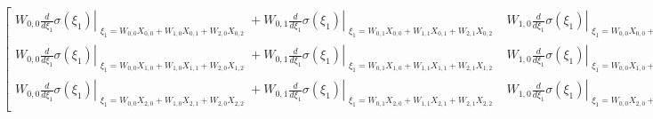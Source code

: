 \documentclass[11pt]{article}
\begin{document}
    $\displaystyle \left[\begin{matrix}W_{0, 0} \left. \frac{d}{d \xi_{1}} \sigma{\left(\xi_{1} \right)} \right|_{\substack{ \xi_{1}=W_{0, 0} X_{0, 0} + W_{1, 0} X_{0, 1} + W_{2, 0} X_{0, 2} }} + W_{0, 1} \left. \frac{d}{d \xi_{1}} \sigma{\left(\xi_{1} \right)} \right|_{\substack{ \xi_{1}=W_{0, 1} X_{0, 0} + W_{1, 1} X_{0, 1} + W_{2, 1} X_{0, 2} }} & W_{1, 0} \left. \frac{d}{d \xi_{1}} \sigma{\left(\xi_{1} \right)} \right|_{\substack{ \xi_{1}=W_{0, 0} X_{0, 0} + W_{1, 0} X_{0, 1} + W_{2, 0} X_{0, 2} }} + W_{1, 1} \left. \frac{d}{d \xi_{1}} \sigma{\left(\xi_{1} \right)} \right|_{\substack{ \xi_{1}=W_{0, 1} X_{0, 0} + W_{1, 1} X_{0, 1} + W_{2, 1} X_{0, 2} }} & W_{2, 0} \left. \frac{d}{d \xi_{1}} \sigma{\left(\xi_{1} \right)} \right|_{\substack{ \xi_{1}=W_{0, 0} X_{0, 0} + W_{1, 0} X_{0, 1} + W_{2, 0} X_{0, 2} }} + W_{2, 1} \left. \frac{d}{d \xi_{1}} \sigma{\left(\xi_{1} \right)} \right|_{\substack{ \xi_{1}=W_{0, 1} X_{0, 0} + W_{1, 1} X_{0, 1} + W_{2, 1} X_{0, 2} }}\\W_{0, 0} \left. \frac{d}{d \xi_{1}} \sigma{\left(\xi_{1} \right)} \right|_{\substack{ \xi_{1}=W_{0, 0} X_{1, 0} + W_{1, 0} X_{1, 1} + W_{2, 0} X_{1, 2} }} + W_{0, 1} \left. \frac{d}{d \xi_{1}} \sigma{\left(\xi_{1} \right)} \right|_{\substack{ \xi_{1}=W_{0, 1} X_{1, 0} + W_{1, 1} X_{1, 1} + W_{2, 1} X_{1, 2} }} & W_{1, 0} \left. \frac{d}{d \xi_{1}} \sigma{\left(\xi_{1} \right)} \right|_{\substack{ \xi_{1}=W_{0, 0} X_{1, 0} + W_{1, 0} X_{1, 1} + W_{2, 0} X_{1, 2} }} + W_{1, 1} \left. \frac{d}{d \xi_{1}} \sigma{\left(\xi_{1} \right)} \right|_{\substack{ \xi_{1}=W_{0, 1} X_{1, 0} + W_{1, 1} X_{1, 1} + W_{2, 1} X_{1, 2} }} & W_{2, 0} \left. \frac{d}{d \xi_{1}} \sigma{\left(\xi_{1} \right)} \right|_{\substack{ \xi_{1}=W_{0, 0} X_{1, 0} + W_{1, 0} X_{1, 1} + W_{2, 0} X_{1, 2} }} + W_{2, 1} \left. \frac{d}{d \xi_{1}} \sigma{\left(\xi_{1} \right)} \right|_{\substack{ \xi_{1}=W_{0, 1} X_{1, 0} + W_{1, 1} X_{1, 1} + W_{2, 1} X_{1, 2} }}\\W_{0, 0} \left. \frac{d}{d \xi_{1}} \sigma{\left(\xi_{1} \right)} \right|_{\substack{ \xi_{1}=W_{0, 0} X_{2, 0} + W_{1, 0} X_{2, 1} + W_{2, 0} X_{2, 2} }} + W_{0, 1} \left. \frac{d}{d \xi_{1}} \sigma{\left(\xi_{1} \right)} \right|_{\substack{ \xi_{1}=W_{0, 1} X_{2, 0} + W_{1, 1} X_{2, 1} + W_{2, 1} X_{2, 2} }} & W_{1, 0} \left. \frac{d}{d \xi_{1}} \sigma{\left(\xi_{1} \right)} \right|_{\substack{ \xi_{1}=W_{0, 0} X_{2, 0} + W_{1, 0} X_{2, 1} + W_{2, 0} X_{2, 2} }} + W_{1, 1} \left. \frac{d}{d \xi_{1}} \sigma{\left(\xi_{1} \right)} \right|_{\substack{ \xi_{1}=W_{0, 1} X_{2, 0} + W_{1, 1} X_{2, 1} + W_{2, 1} X_{2, 2} }} & W_{2, 0} \left. \frac{d}{d \xi_{1}} \sigma{\left(\xi_{1} \right)} \right|_{\substack{ \xi_{1}=W_{0, 0} X_{2, 0} + W_{1, 0} X_{2, 1} + W_{2, 0} X_{2, 2} }} + W_{2, 1} \left. \frac{d}{d \xi_{1}} \sigma{\left(\xi_{1} \right)} \right|_{\substack{ \xi_{1}=W_{0, 1} X_{2, 0} + W_{1, 1} X_{2, 1} + W_{2, 1} X_{2, 2} }}\end{matrix}\right]$
\end{document}
